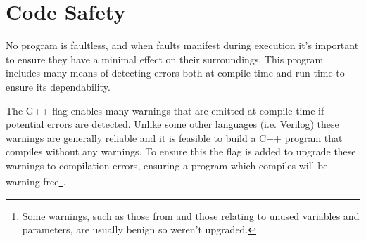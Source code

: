 \section{Code Safety}\label{sec:Impl:CodeSafety}
No program is faultless, and when faults manifest during execution it's important to ensure they have a minimal effect on their surroundings.
This program includes many means of detecting errors both at compile-time and run-time to ensure its dependability.

The G++ flag  enables many warnings that are emitted at compile-time if potential errors are detected.
Unlike some other languages (i.e. Verilog) these warnings are generally reliable and it is feasible to build a C++ program that compiles without any warnings.
To ensure this the  flag is added to upgrade these warnings to compilation errors, ensuring a program which compiles will be warning-free\footnote{Some warnings, such as those from  and those relating to unused variables and parameters, are usually benign so weren't upgraded.}.

